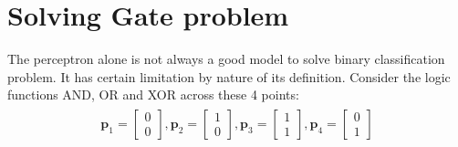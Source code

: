 \section{Solving Gate problem}
The perceptron alone is not always a good model to solve binary classification problem. It has certain limitation by nature of its definition. Consider the logic functions AND, OR and XOR across these 4 points:
\begin{align}
  \begin{matrix}
    \textbf{p}_1 = \begin{bmatrix}
      0 \\
      0
    \end{bmatrix},
    \textbf{p}_2 = \begin{bmatrix}
      1 \\
      0
    \end{bmatrix},
    \textbf{p}_3 = \begin{bmatrix}
      1 \\
      1
    \end{bmatrix},
    \textbf{p}_4 = \begin{bmatrix}
      0 \\
      1
    \end{bmatrix}  
  \end{matrix}
\end{align}
